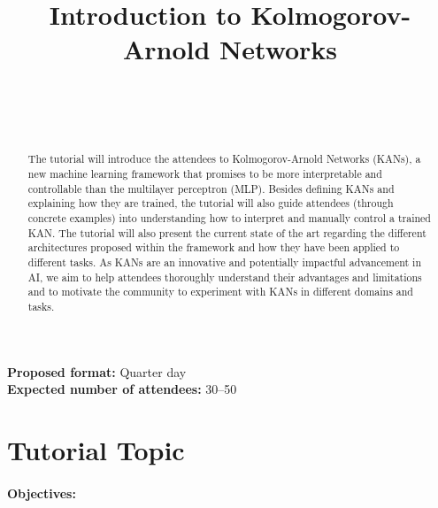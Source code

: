 \documentclass{ecai}
\newcommand{\quotes}[1]{`#1'}
\begin{document}
\begin{frontmatter}


\title{Introduction to Kolmogorov-Arnold Networks}

\author{~}
\author{~}

\address{Institute of Informatics and Telecommunications,
  NCSR~\quotes{Demokritos}, Ag.~Paraskevi, Greece}


\begin{abstract}
The tutorial will introduce the attendees to Kolmogorov-Arnold
Networks (KANs), a new machine learning framework that promises to be
more interpretable and controllable than the multilayer perceptron (MLP).
Besides defining KANs and explaining how they are trained, the
tutorial will also guide attendees (through concrete examples) into
understanding how to interpret and manually control a trained KAN.  The
tutorial will also present the current state of the art regarding the
different architectures proposed within the framework and how they
have been applied to different tasks. As KANs are an innovative and
potentially impactful advancement in AI, we aim to help attendees
thoroughly understand their advantages and limitations and to motivate
the community to experiment with KANs in different domains and tasks. 
\end{abstract}

\end{frontmatter}

\hfill \break
\textbf{Proposed format:} Quarter day
\\
\textbf{Expected number of attendees:} 30--50



\section{Tutorial Topic}


\paragraph{Objectives:}
\end{document}
